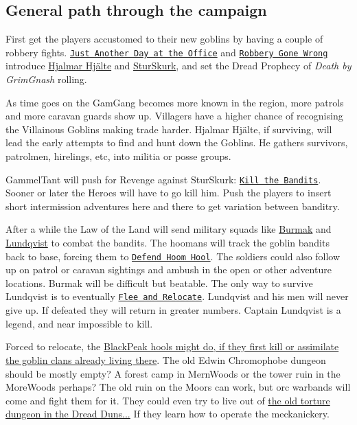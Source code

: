 \subsection*{General path through the campaign}

First get the players accustomed to their new goblins by having a couple of robbery fights. \hyperref[00justanotherdayattheoffice]{\texttt{Just Another Day at the Office}} and \hyperref[01robberygonewrong]{\texttt{Robbery Gone Wrong}} introduce \hyperref[hjalmarhjalte]{Hjalmar Hjälte} and \hyperref[sturskurkboss]{SturSkurk}, and set the Dread Prophecy of \emph{Death by GrimGnash} rolling.

As time goes on the GamGang becomes more known in the region, more patrols and more caravan guards show up. Villagers have a higher chance of recognising the Villainous Goblins making trade harder. Hjalmar Hjälte, if surviving, will lead the early attempts to find and hunt down the Goblins. He gathers survivors, patrolmen, hirelings, etc, into militia or posse groups.

GammelTant will push for Revenge against SturSkurk: \hyperref[02killthebandits]{\texttt{Kill the Bandits}}. Sooner or later the Heroes will have to go kill him. Push the players to insert short intermission adventures here and there to get variation between banditry.

After a while the Law of the Land will send military squads like \hyperref[appendixburmak]{Burmak} and \hyperref[appendixlundqvist]{Lundqvist} to combat the bandits. The hoomans will track the goblin bandits back to base, forcing them to \hyperref[03defendhoomhool]{\texttt{Defend Hoom Hool}}. The soldiers could also follow up on patrol or caravan sightings and ambush in the open or other adventure locations. Burmak will be difficult but beatable. The only way to survive Lundqvist is to eventually \hyperref[04fleeandrelocate]{\texttt{Flee and Relocate}}. Lundqvist and his men will never give up. If defeated they will return in greater numbers. Captain Lundqvist is a legend, and near impossible to kill.

Forced to relocate, the \hyperref[appendixmountaingoblins]{BlackPeak hools might do, if they first kill or assimilate the goblin clans already living there}. The old Edwin Chromophobe dungeon should be mostly empty? A forest camp in MernWoods or the tower ruin in the MoreWoods perhaps? The old ruin on the Moors can work, but orc warbands will come and fight them for it. They could even try to live out of \hyperref[appendixtorturedungeon]{the old torture dungeon in the Dread Duns...} If they learn how to operate the meckanickery.


